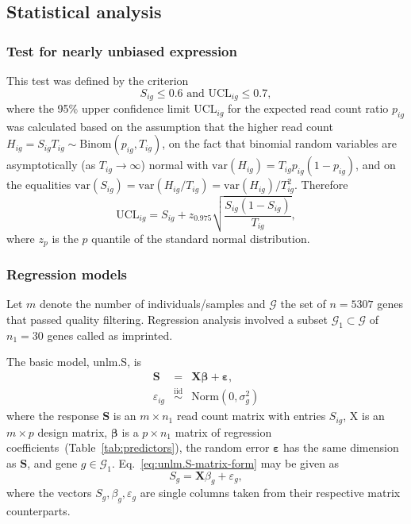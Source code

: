 \documentclass[12pt,letterpaper]{article}
\begin{document}
\subsection{Statistical analysis}

\subsubsection{Test for nearly unbiased expression}

This test was defined by the criterion
\begin{equation}
S_{ig} \le 0.6 \text{ and } \mathrm{UCL}_{ig} \le 0.7,
\label{eq:unbiased-test}
\end{equation}
where the 95\% upper confidence limit \(\mathrm{UCL}_{ig}\) for the expected
read count ratio \(p_{ig}\) was calculated based on the assumption
that the higher read count \(H_{ig}=S_{ig}T_{ig}\sim \mathrm{Binom}(p_{ig},
T_{ig})\), on the fact that binomial random variables are
asymptotically (as \(T_{ig}\rightarrow \infty\)) normal with
\(\mathrm{var}(H_{ig}) = T_{ig}p_{ig}(1-p_{ig})\), and on the equalities
\(\mathrm{var}(S_{ig}) = \mathrm{var}(H_{ig}/T_{ig}) =
\mathrm{var}(H_{ig})/T_{ig}^2\).  Therefore
\begin{equation}
\mathrm{UCL}_{ig} = S_{ig} + z_{0.975} \sqrt{\frac{S_{ig} (1 - S_{ig})}{T_{ig}}},
\end{equation}
where $z_{p}$ is the $p$ quantile of the standard normal distribution.

\subsubsection{Regression models}
\label{sec:methods-regression}

Let \(m\) denote the number of individuals/samples and \(\mathcal{G}\) the set
of \(n=5307\) genes that passed quality filtering.  Regression analysis
involved a subset \(\mathcal{G}_1\subset\mathcal{G}\) of \(n_1=30\) genes
called as imprinted.

The basic model, unlm.S, is
\begin{eqnarray}
\mathbf{S} &=& \mathbf{X} \boldsymbol{\beta} + \boldsymbol{\varepsilon},
\label{eq:unlm.S-matrix-form} \\
\varepsilon_{ig} &\overset{\mathrm{iid}}{\sim}& \mathrm{Norm}(0, \sigma^2_g)
\end{eqnarray}
where the response \(\mathbf{S}\) is an \(m\times n_1\) read count matrix with
entries \(S_{ig}\), \(\mathrm{X}\) is an \(m\times p\) design matrix,
\(\boldsymbol{\beta}\) is a \(p\times n_1\) matrix of regression
coefficients~(Table~\ref{tab:predictors}), the random error
\(\boldsymbol{\varepsilon}\) has the same dimension as \(\mathbf{S}\), and
gene \(g\in \mathcal{G}_1\).  Eq.~\ref{eq:unlm.S-matrix-form} may be given as
\begin{equation}
S_g = \mathbf{X} \beta_g + \varepsilon_g,
\label{eq:unlm.S-vector-form}
\end{equation}
where the vectors \(S_g, \beta_g, \varepsilon_g\)
are single columns taken from their respective matrix counterparts.
\end{document}
